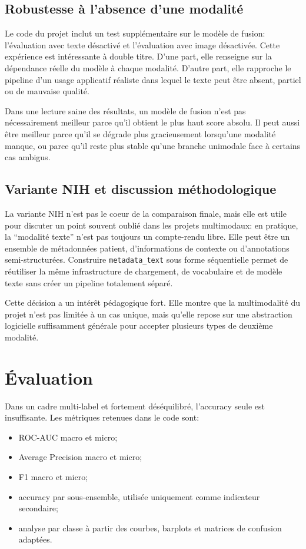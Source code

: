 \documentclass[11pt,a4paper]{article}
\newif\ifsectionbreakenabled
\let\oldsection\section
\renewcommand{\section}[1]{%
    \ifsectionbreakenabled
        \clearpage
    \else
        \sectionbreakenabledtrue
    \fi
    \oldsection{#1}%
}
\begin{document}
\subsection{Robustesse \`a l'absence d'une modalit\'e}
Le code du projet inclut un test suppl\'ementaire sur le mod\`ele de fusion: l'\'evaluation avec texte d\'esactiv\'e et l'\'evaluation avec image d\'esactiv\'ee. Cette exp\'erience est int\'eressante \`a double titre. D'une part, elle renseigne sur la d\'ependance r\'eelle du mod\`ele \`a chaque modalit\'e. D'autre part, elle rapproche le pipeline d'un usage applicatif r\'ealiste dans lequel le texte peut \^etre absent, partiel ou de mauvaise qualit\'e.

Dans une lecture saine des r\'esultats, un mod\`ele de fusion n'est pas n\'ecessairement meilleur parce qu'il obtient le plus haut score absolu. Il peut aussi \^etre meilleur parce qu'il se d\'egrade plus gracieusement lorsqu'une modalit\'e manque, ou parce qu'il reste plus stable qu'une branche unimodale face \`a certains cas ambigus.

\subsection{Variante NIH et discussion m\'ethodologique}
La variante NIH n'est pas le coeur de la comparaison finale, mais elle est utile pour discuter un point souvent oubli\'e dans les projets multimodaux: en pratique, la ``modalit\'e texte'' n'est pas toujours un compte-rendu libre. Elle peut \^etre un ensemble de m\'etadonn\'ees patient, d'informations de contexte ou d'annotations semi-structur\'ees. Construire \texttt{metadata\_text} sous forme s\'equentielle permet de r\'eutiliser la m\^eme infrastructure de chargement, de vocabulaire et de mod\`ele texte sans cr\'eer un pipeline totalement s\'epar\'e.

Cette d\'ecision a un int\'er\^et p\'edagogique fort. Elle montre que la multimodalit\'e du projet n'est pas limit\'ee \`a un cas unique, mais qu'elle repose sur une abstraction logicielle suffisamment g\'en\'erale pour accepter plusieurs types de deuxi\`eme modalit\'e.

\section{\'Evaluation}
Dans un cadre multi-label et fortement d\'es\'equilibr\'e, l'accuracy seule est insuffisante. Les m\'etriques retenues dans le code sont:
\begin{itemize}
    \item ROC-AUC macro et micro;
    \item Average Precision macro et micro;
    \item F1 macro et micro;
    \item accuracy par sous-ensemble, utilis\'ee uniquement comme indicateur secondaire;
    \item analyse par classe \`a partir des courbes, barplots et matrices de confusion adapt\'ees.
\end{itemize}
\end{document}
